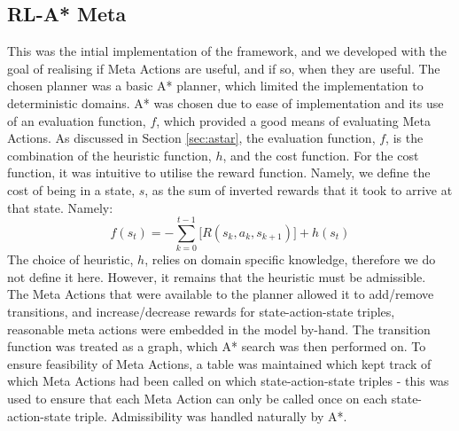\subsection{RL-A* Meta}
This was the intial implementation of the framework, and we developed with the goal of realising if Meta Actions are useful, and if so, when they are useful. The chosen planner was a basic A* planner, which limited the implementation to deterministic domains. A* was chosen due to ease of implementation and its use of an evaluation function, $f$, which provided a good means of evaluating Meta Actions. As discussed in Section \ref{sec:astar}, the evaluation function, $f$, is the combination of the heuristic function, $h$, and the cost function. For the cost function, it was intuitive to utilise the reward function. Namely, we define the cost of being in a state, $s$, as the sum of inverted rewards that it took to arrive at that state. Namely:
\begin{equation}
\label{eqn:astarval}
f(s_t) = -\sum_{k=0}^{t-1}\Bigg[R(s_k, a_k, s_{k+1})\Bigg] + h(s_t)
\end{equation}
The choice of heuristic, $h$, relies on domain specific knowledge, therefore we do not define it here. However,  it remains that the heuristic must be admissible.
\\The Meta Actions that were available to the planner allowed it to add/remove transitions, and increase/decrease rewards for state-action-state triples, reasonable meta actions were embedded in the model by-hand. The transition function was treated as a graph, which A* search was then performed on. To ensure feasibility of Meta Actions, a table was maintained which kept track of which Meta Actions had been called on which state-action-state triples - this was used to ensure that each Meta Action can only be called once on each state-action-state triple. Admissibility was handled naturally by A*.
